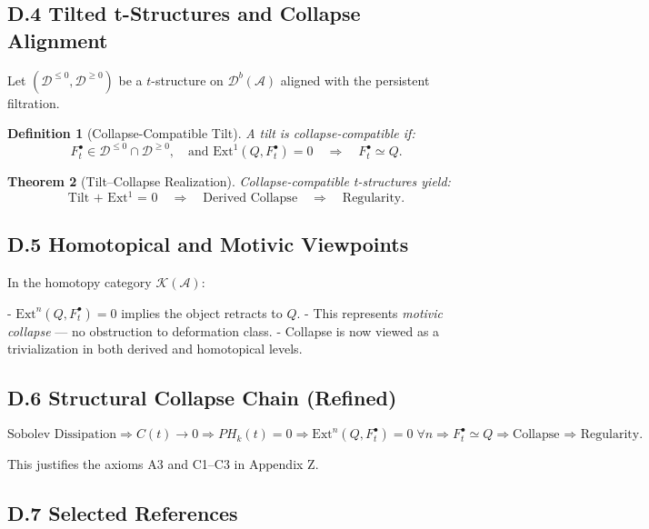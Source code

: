\documentclass[11pt]{article}
\newtheorem{theorem}{Theorem}[section]
\newtheorem{definition}[theorem]{Definition}
\begin{document}
\subsection*{D.4 Tilted t-Structures and Collapse Alignment}

Let $(\mathcal{D}^{\leq 0}, \mathcal{D}^{\geq 0})$ be a $t$-structure on $\mathcal{D}^b(\mathcal{A})$ aligned with the persistent filtration.

\begin{definition}[Collapse-Compatible Tilt]
A tilt is collapse-compatible if:
\[
F^\bullet_t \in \mathcal{D}^{\leq 0} \cap \mathcal{D}^{\geq 0},\quad \text{and } \mathrm{Ext}^1(Q, F^\bullet_t) = 0 \quad \Rightarrow \quad F^\bullet_t \simeq Q.
\]
\end{definition}

\begin{theorem}[Tilt–Collapse Realization]
Collapse-compatible t-structures yield:
\[
\text{Tilt + Ext$^1$ = 0} \quad \Rightarrow \quad \text{Derived Collapse} \quad \Rightarrow \quad \text{Regularity}.
\]
\end{theorem}

\subsection*{D.5 Homotopical and Motivic Viewpoints}

In the homotopy category $\mathcal{K}(\mathcal{A})$:

- $\mathrm{Ext}^n(Q, F^\bullet_t) = 0$ implies the object retracts to $Q$.
- This represents \emph{motivic collapse} — no obstruction to deformation class.
- Collapse is now viewed as a trivialization in both derived and homotopical levels.

\subsection*{D.6 Structural Collapse Chain (Refined)}

\[
\text{Sobolev Dissipation}
\Rightarrow
C(t) \to 0
\Rightarrow
PH_k(t) = 0
\Rightarrow
\mathrm{Ext}^n(Q, F^\bullet_t) = 0 \; \forall n
\Rightarrow
F^\bullet_t \simeq Q
\Rightarrow
\text{Collapse ⇒ Regularity}.
\]

This justifies the axioms A3 and C1–C3 in Appendix Z.

\subsection*{D.7 Selected References}
\end{document}
